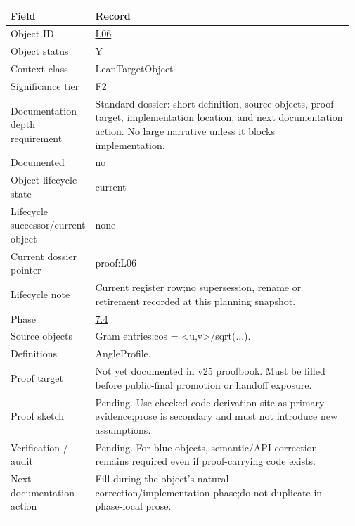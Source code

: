 \begin{longtable}{L{0.16\linewidth} L{0.81\linewidth}}
\hline
\textbf{Field} & \textbf{Record}\\
\hline
Object ID & \hyperlink{object-row-L06}{L06}\\
\hline\addlinespace[0.20em]
Object status & Y\\
\hline\addlinespace[0.20em]
Context class & LeanTargetObject\\
\hline\addlinespace[0.20em]
Significance tier & F2\\
\hline\addlinespace[0.20em]
Documentation depth requirement & Standard dossier: short definition, source objects, proof target, implementation location, and next documentation action. No large narrative unless it blocks implementation.\\
\hline\addlinespace[0.20em]
Documented & no\\
\hline\addlinespace[0.20em]
Object lifecycle state & current\\
\hline\addlinespace[0.20em]
Lifecycle successor/\allowbreak{}current object & none\\
\hline\addlinespace[0.20em]
Current dossier pointer & proof:L06\\
\hline\addlinespace[0.20em]
Lifecycle note & Current register row;\newline no supersession, rename or retirement recorded at this planning snapshot.\\
\hline\addlinespace[0.20em]
Phase & \hyperlink{phase-row-7-4}{7.4}\\
\hline\addlinespace[0.20em]
Source objects & Gram entries;\newline cos = <u,v>/\allowbreak{}sqrt(...).\\
\hline\addlinespace[0.20em]
Definitions & AngleProfile.\\
\hline\addlinespace[0.20em]
Proof target & Not yet documented in v25 proofbook. Must be filled before public-final promotion or handoff exposure.\\
\hline\addlinespace[0.20em]
Proof sketch & Pending. Use checked code derivation site as primary evidence;\newline prose is secondary and must not introduce new assumptions.\\
\hline\addlinespace[0.20em]
Verification /\allowbreak{} audit & Pending. For blue objects, semantic/\allowbreak{}API correction remains required even if proof-carrying code exists.\\
\hline\addlinespace[0.20em]
Next documentation action & Fill during the object's natural correction/\allowbreak{}implementation phase;\newline do not duplicate in phase-local prose.\\
\hline\addlinespace[0.20em]
\end{longtable}
